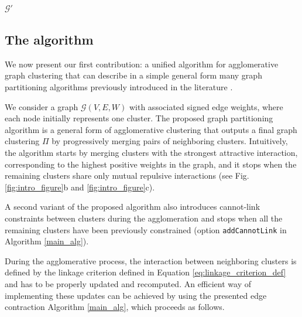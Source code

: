 \begin{algorithm}
\begin{algorithmic}[1]
      \State
      \State
      \Return $\mathcal{G}'$



  \end{algorithmic}
  \label{main_alg}
\end{algorithm}


\subsection{The algorithm}

We now present our first contribution: a unified algorithm for agglomerative graph clustering that can describe in a simple general form many graph partitioning algorithms previously introduced in the literature .

We consider a graph $\mathcal{G}(V,E,W)$ with associated signed edge weights, where each node initially represents one cluster.
The proposed graph partitioning algorithm is a general form of agglomerative clustering that outputs a final graph clustering $\Pi$ by progressively merging pairs of neighboring clusters. Intuitively, the algorithm starts by merging clusters with the strongest attractive interaction, corresponding to the highest positive weights in the graph, and it stops when the remaining clusters share only mutual repulsive interactions (see Fig. \ref{fig:intro_figure}b and \ref{fig:intro_figure}c). 

A second variant of the proposed algorithm also introduces cannot-link constraints between clusters during the agglomeration and stops when all the remaining clusters have been previously constrained (option \texttt{addCannotLink} in Algorithm \ref{main_alg}).


During the agglomerative process, the interaction between neighboring clusters is defined by the linkage criterion defined in Equation \ref{eq:linkage_criterion_def} and has to be properly updated and recomputed. 
An efficient way of implementing these updates can be achieved by using the presented edge contraction Algorithm \ref{main_alg}, which proceeds as follows.

